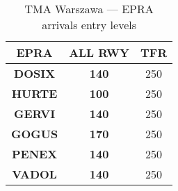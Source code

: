 \begin{table}[htbp]
  \centering
  \begin{tabular}{|c|c|c|}
    \hline\rowcolor{white}
    \cellcolor{vred}\color{white}\textbf{EPRA}&\textbf{ALL RWY}&\textbf{TFR}\\\hline
    \textbf{DOSIX} & \textbf{140} & 250\\\hline
    \textbf{HURTE} & \textbf{100} & 250\\\hline
    \textbf{GERVI} & \textbf{140} & 250\\\hline
    \textbf{GOGUS} & \textbf{170} & 250\\\hline
    \textbf{PENEX} & \textbf{140} & 250\\\hline
    \textbf{VADOL} & \textbf{140} & 250\\\hline
  \end{tabular}
  \caption{TMA Warszawa --- EPRA arrivals entry levels}
  \label{tab:acc:coordination:warszawa:EPRA:entry}
\end{table}
